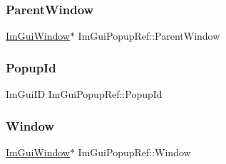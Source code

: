 \subsubsection{\texorpdfstring{Parent\+Window}{ParentWindow}}
{\footnotesize\ttfamily \hyperlink{struct_im_gui_window}{Im\+Gui\+Window}$\ast$ Im\+Gui\+Popup\+Ref\+::\+Parent\+Window}

\hypertarget{struct_im_gui_popup_ref_a7037780575e28439414d28625a495bad}{}\label{struct_im_gui_popup_ref_a7037780575e28439414d28625a495bad} 
\subsubsection{\texorpdfstring{Popup\+Id}{PopupId}}
{\footnotesize\ttfamily Im\+Gui\+ID Im\+Gui\+Popup\+Ref\+::\+Popup\+Id}

\hypertarget{struct_im_gui_popup_ref_a471027209038d1d59280a84c8d236f34}{}\label{struct_im_gui_popup_ref_a471027209038d1d59280a84c8d236f34} 
\subsubsection{\texorpdfstring{Window}{Window}}
{\footnotesize\ttfamily \hyperlink{struct_im_gui_window}{Im\+Gui\+Window}$\ast$ Im\+Gui\+Popup\+Ref\+::\+Window}

